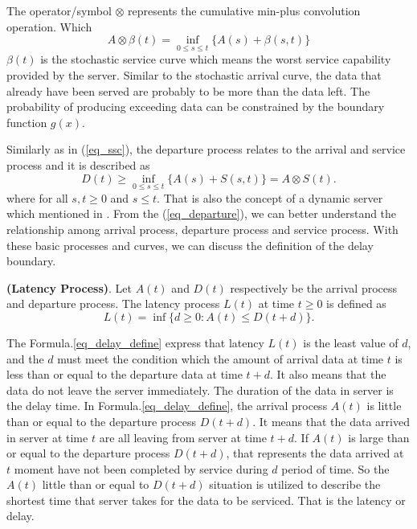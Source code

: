 \documentclass[runningheads]{llncs}
\begin{document}
The operator/symbol $\otimes$ represents the cumulative min-plus convolution operation.
Which
\begin{equation}\label{eq_convolution}
A\otimes\beta(t) = \inf_{0 \leqslant s \leqslant t}\{A(s)+\beta(s,t)\}
\end{equation}
$\beta(t)$ is the stochastic service curve which means the worst service capability provided by the server.
Similar to the stochastic arrival curve, the data that already have been served are probably to be more than the data left.
The probability of producing exceeding data can be constrained by the boundary function $g(x)$.

Similarly as in (\ref{eq_ssc}), the departure process relates to the arrival and service process and it is described as
\begin{equation}\label{eq_departure}
D(t) \geq \inf_{0\leqslant s \leqslant t}\{A(s)+ S(s,t)\} =  A \otimes S(t).
\end{equation}
where for all $s,t \geqslant 0$ and $s \leqslant t$.
That is also the concept of a dynamic server which mentioned in \cite{b5}.
From the (\ref{eq_departure}), we can better understand the relationship among arrival process, departure process and service process.
With these basic processes and curves, we can discuss the definition of the delay boundary.

\begin{definition}\label{def_delay_process}
{\bfseries(Latency Process)}.
Let $A(t)$ and $D(t)$ respectively be the arrival process and departure process.
The latency process $L(t)$ at time $t \geq 0$ is defined as
\begin{equation}\label{eq_delay_define}
L(t) = \inf\{d \geq 0 : A(t) \leq D(t+d)\}.
\end{equation}
\end{definition}

The Formula.\ref{eq_delay_define} express that latency $L(t)$ is the least value of $d$, and the $d$ must meet the condition which the amount of arrival data at time $t$ is less than or equal to the departure data at time $t+d$.
It also means that the data do not leave the server immediately.
The duration of the data in server is the delay time.
In Formula.\ref{eq_delay_define}, the arrival process $A(t)$ is little than or equal to the departure process $D(t+d)$.
It means that the data arrived in server at time $t$ are all leaving from server at time $t+d$.
If $A(t)$ is large than or equal to the departure process $D(t+d)$, that represents the data arrived at $t$ moment have not been completed by service during $d$ period of time.
So the $A(t)$ little than or equal to $D(t+d)$ situation is utilized to describe the shortest time that server takes for the data to be serviced.
That is the latency or delay.
\end{document}
